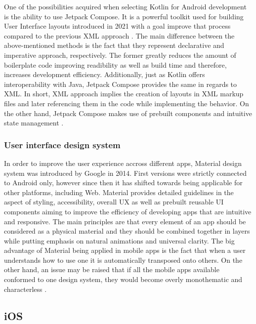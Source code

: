 One of the possibilities acquired when selecting Kotlin for Android development is the ability to use Jetpack Compose. It is a powerful toolkit used for building User Interface layouts introduced in 2021 with a goal improve that process compared to the previous XML approach \cite{android_jetpack_compose}. 
The main difference between the above-mentioned methods is the fact that they represent declarative and imperative approach, respectively. The former greatly reduces the amount of boilerplate code improving readibility as well as build time and therefore, increases development efficiency. Additionally, just as Kotlin offers interoperability with Java, Jetpack Compose provides the same in regards to XML. In short, XML approach implies the creation of layouts in XML markup files and later referencing them in the code while implementing the behavior. On the other hand, Jetpack Compose makes use of prebuilt components and intuitive state management \cite{jetpack_compose_vs_xml}. 

\subsubsection*{User interface design system}

In order to improve the user experience accross different apps, Material design system was introduced by Google in 2014. First versions were strictly connected to Android only, however since then it has shifted towards being applicable for other platforms, including Web. Material provides detailed guidelines in the aspect of styling, accessibility, overall UX as well as prebuilt reusable UI components aiming to improve the efficiency of developing apps that are intuitive and responsive. The main principles are that every element of an app should be considered as a physical material and they should be combined together in layers while putting emphasis on natural animations and universal clarity. The big advantage of Material being applied in mobile apps is the fact that when a user understands how to use one it is automatically transposed onto others. On the other hand, an issue may be raised that if all the mobile apps available conformed to one design system, they would become overly monothematic and characterless \cite{material_design_get_started,material_design_pros_cons}.

\subsection{iOS}

